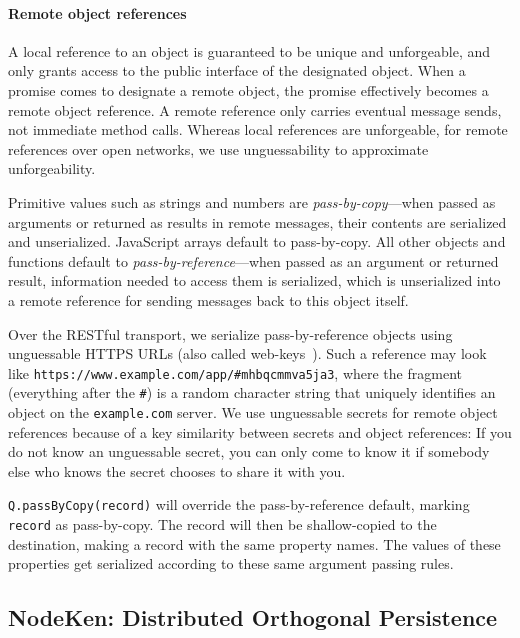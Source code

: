 \documentclass{llncs}
\begin{document}
\paragraph{Remote object references}

A local reference to an object is guaranteed to be unique and unforgeable, and only grants access to the public interface of the designated object. When a promise comes to designate a remote object, the promise effectively becomes a remote object reference. A remote reference only carries eventual message sends, not immediate method calls. Whereas local references are unforgeable, for remote references over open networks, we use unguessability to approximate unforgeability.

Primitive values such as strings and numbers are \emph{pass-by-copy}---when passed as arguments or returned as results in remote messages, their contents are serialized and unserialized. JavaScript arrays default to pass-by-copy. All other objects and functions default to \emph{pass-by-reference}---when passed as an argument or returned result, information needed to access them is serialized, which is unserialized into a remote reference for sending messages back to this object itself.

Over the RESTful transport, we serialize pass-by-reference objects using unguessable HTTPS URLs (also called web-keys~\cite{Close:Webkeys}). Such a reference may look like {\tt https://www.example.com/app/\#mhbqcmmva5ja3}, where the fragment (everything after the {\tt \#}) is a random character string that uniquely identifies an object on the {\tt example.com} server. We use unguessable secrets for remote object references because of a key similarity between secrets and object references: If you do not know an unguessable secret, you can only come to know it if somebody else who knows the secret chooses to share it with you.

\begin{description*}
\item[{\tt Q.passByCopy(record)}] will override the pass-by-reference default, marking {\tt record} as pass-by-copy. The record will then be shallow-copied to the destination, making a record with the same property names. The values of these properties get serialized according to these same argument passing rules.
\end{description*}

\subsection{NodeKen: Distributed Orthogonal Persistence}
\label{NodeKen}
\end{document}
